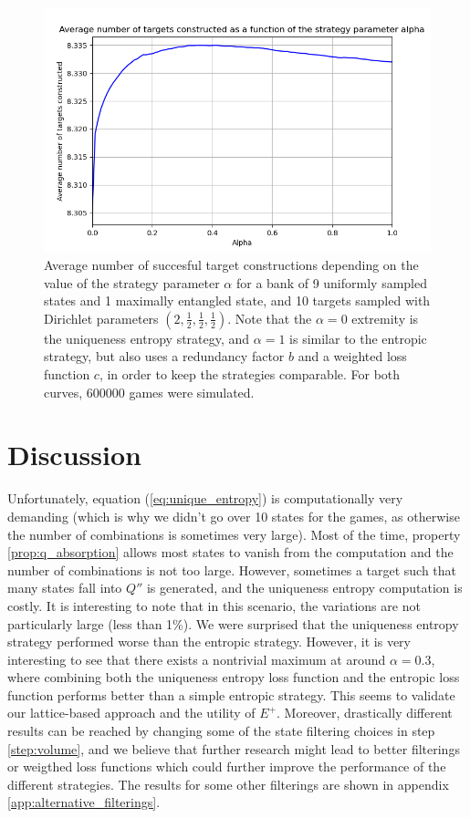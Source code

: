 \begin{figure}[h!]
    \centering
    \includegraphics[scale=0.6]{images/cool_locc_30_0.2_True.png}
    \caption{Average number of succesful target constructions depending on the value of the strategy parameter $\alpha$ for a bank of 9 uniformly sampled states and 1 maximally entangled state, and 10 targets sampled with Dirichlet parameters $\left(2, \frac{1}{2}, \frac{1}{2}, \frac{1}{2}\right)$. Note that the $\alpha = 0$ extremity is the uniqueness entropy strategy, and $\alpha = 1$ is similar to the entropic strategy, but also uses a redundancy factor $b$ and a weighted loss function $c$, in order to keep the strategies comparable. For both curves, 600000 games were simulated.}
    \label{fig:strategy_comparison}
\end{figure}

\section{Discussion}

Unfortunately, equation (\ref{eq:unique_entropy}) is computationally very demanding (which is why we didn't go over 10 states for the games, as otherwise the number of combinations is sometimes very large). Most of the time, property \ref{prop:q_absorption} allows most states to vanish from the computation and the number of combinations is not too large. However, sometimes a target such that many states fall into $Q''$ is generated, and the uniqueness entropy computation is costly. It is interesting to note that in this scenario, the variations are not particularly large (less than 1\%). We were surprised that the uniqueness entropy strategy performed worse than the entropic strategy. However, it is very interesting to see that there exists a nontrivial maximum at around $\alpha = 0.3$, where combining both the uniqueness entropy loss function and the entropic loss function performs better than a simple entropic strategy. This seems to validate our lattice-based approach and the utility of $E^+$. Moreover, drastically different results can be reached by changing some of the state filtering choices in step \ref{step:volume}, and we believe that further research might lead to better filterings or weigthed loss functions which could further improve the performance of the different strategies. The results for some other filterings are shown in appendix \ref{app:alternative_filterings}.

